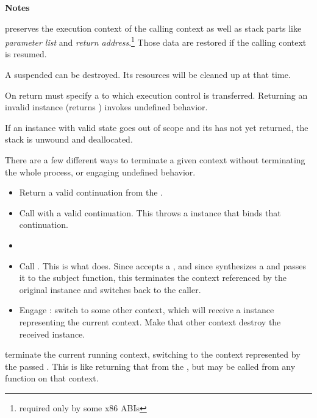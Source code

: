 {\bfseries Notes}
\begin{description}
\item \callcc preserves the execution context of the calling context as well as stack
parts like \emph{parameter list} and \emph{return address}.\footnote{required
only by some x86 ABIs} Those data are restored if the calling context is resumed.
\item A suspended  can be destroyed. Its resources will be cleaned
up at that time.
\item On return  must specify a \cont to which execution control is
transferred. Returning an invalid \cont instance (\opbool returns )
invokes undefined behavior.
\item If an instance with valid state goes out of scope and its  has not yet
returned, the stack is unwound and deallocated.
\item There are a few different ways to terminate a given context without
terminating the whole process, or engaging undefined behavior.

\begin{itemize}
\item Return a valid continuation from the \entryfn {}.
\item Call \unwindcont with a valid continuation. This throws a \unwindex
instance that binds that continuation.
\item {}
\item
Call .
This is what \dtor does. Since \unwindcont accepts a \cont, and
since \resumewith synthesizes a \cont and passes it to the subject function,
this terminates the context referenced by the original \cont instance and
switches back to the caller.
\item Engage \dtor: switch to some other context, which will
receive a \cont instance representing the current context. Make that other
context destroy the received \cont instance.
\end{itemize}
\end{description}


terminate the current running context, switching to the context represented by
the passed \cont. This is like returning that \cont from the \entryfn, but may
be called from any function on that context.

